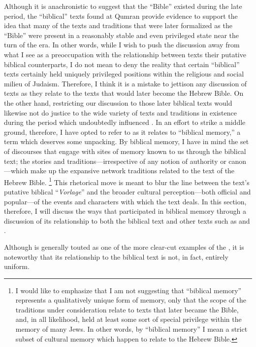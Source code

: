 Although it is anachronistic to suggest that the ``Bible''  existed during the late \secondtemple period, the ``biblical'' texts found at Qumran provide evidence to support the idea that many of the texts and traditions that were later formalized as the ``Bible'' were present in a reasonably stable and even privileged state near the turn of the era. In other words, while I wish to push the discussion away from what I see as a preoccupation with the relationship between \rwb texts their putative biblical counterparts, I do not mean to deny the reality that certain ``biblical'' texts certainly held uniquely privileged positions within the religious and social milieu of \secondtemple Judaism. Therefore, I think it is a mistake to jettison any discussion of \rwb texts as they relate to the texts that would later become the Hebrew Bible. On the other hand, restricting our discussion to those later biblical texts would likewise not do justice to the wide variety of texts and traditions in existence during the \secondtemple period which undoubtedly influenced \ga. In an effort to strike a middle ground, therefore, I have opted to refer to \ga as it relates to ``biblical memory,'' a term which deserves some unpacking. By biblical memory, I have in mind the set of discourses that engage with sites of memory known to us through the biblical text; the stories and traditions---irrespective of any notion of authority or canon---which make up the expansive network traditions related to the text of the Hebrew Bible.%
    \footnote{I would like to emphasize that I am not suggesting that ``biblical memory'' represents a qualitatively unique form of memory, only that the scope of the traditions under consideration relate to texts that later became the Bible, and, in all likelihood, held at least some sort of special privilege within the memory of many \secondtemple Jews. In other words, by ``biblical memory'' I mean a strict subset of cultural memory which happen to relate to the Hebrew Bible.}
This rhetorical move is meant to blur the line between the \rwb text's putative biblical ``\emph{Vorlage}'' and the broader cultural perception---both official and popular---of the events and characters with which the \rwb text deals. In this section, therefore, I will discuss the ways that \ga participated in biblical memory through a discussion of its relationship to both the biblical text and other \secondtemple texts such as \jub and \firstenoch.

Although \ga is generally touted as one of the more clear-cut examples of the \rwb, it is noteworthy that its relationship to the biblical text is not, in fact, entirely uniform.%
    \autocite[333]{bernstein_berthelot-etal2010}


